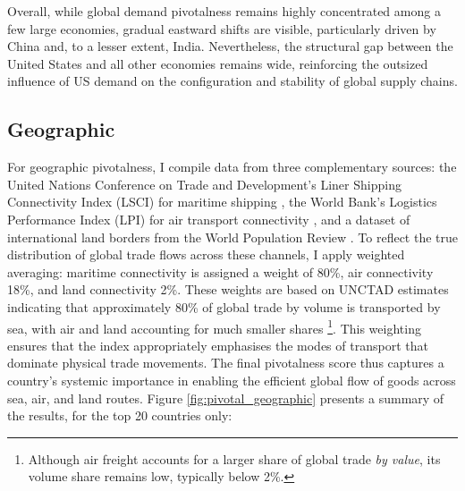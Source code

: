 \documentclass[11pt]{article}
\begin{document}
Overall, while global demand pivotalness remains highly concentrated among a few large economies, gradual eastward shifts are visible, particularly driven by China and, to a lesser extent, India. Nevertheless, the structural gap between the United States and all other economies remains wide, reinforcing the outsized influence of US demand on the configuration and stability of global supply chains.

\subsection{Geographic}

For geographic pivotalness, I compile data from three complementary sources: the United Nations Conference on Trade and Development’s Liner Shipping Connectivity Index (LSCI) for maritime shipping \citep{unctad2023lsci}, the World Bank’s Logistics Performance Index (LPI) for air transport connectivity \citep{worldbank2023lpi}, and a dataset of international land borders from the World Population Review \citep{wpr2025landborders}. To reflect the true distribution of global trade flows across these channels, I apply weighted averaging: maritime connectivity is assigned a weight of 80\%, air connectivity 18\%, and land connectivity 2\%. These weights are based on UNCTAD estimates indicating that approximately 80\% of global trade by volume is transported by sea, with air and land accounting for much smaller shares \citep{unctad2023}\footnote{Although air freight accounts for a larger share of global trade \textit{by value}, its volume share remains low, typically below 2\%.}. This weighting ensures that the index appropriately emphasises the modes of transport that dominate physical trade movements. The final pivotalness score thus captures a country’s systemic importance in enabling the efficient global flow of goods across sea, air, and land routes. Figure \ref{fig:pivotal_geographic} presents a summary of the results, for the top 20 countries only:
\end{document}
